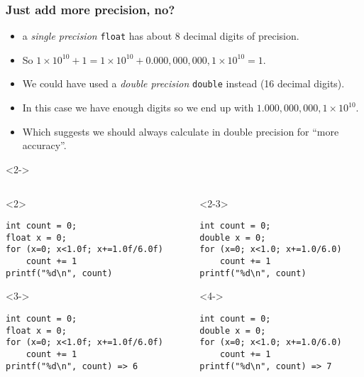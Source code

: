 \documentclass[presentation]{beamer}
\begin{document}
\begin{frame}[fragile]
  \frametitle{Just add more precision, no?}

  \begin{itemize}
  \item a \emph{single precision} \texttt{float} has about 8 decimal
    digits of precision.
  \item So $1\times10^{10} + 1 = 1\times10^{10} + 0.000,000,000,1\times10^{10} = 1$.
  \item We could have used a \emph{double precision} \texttt{double}
    instead (16 decimal digits).
  \item In this case we have enough digits so we end up with
    $1.000,000,000,1\times10^{10}$.
  \item Which suggests we should always calculate in double precision
    for ``more accuracy''.
  \end{itemize}

  \begin{uncoverenv}<2->
    \begin{columns}
      \begin{column}{0.5\textwidth}
        \begin{onlyenv}<2>
\begin{verbatim}
int count = 0;
float x = 0;
for (x=0; x<1.0f; x+=1.0f/6.0f)
    count += 1
printf("%d\n", count)
\end{verbatim}
        \end{onlyenv}
        \begin{onlyenv}<3->
\begin{verbatim}
int count = 0;
float x = 0;
for (x=0; x<1.0f; x+=1.0f/6.0f)
    count += 1
printf("%d\n", count) => 6
\end{verbatim}
        \end{onlyenv}
      \end{column}
      \begin{column}{0.5\textwidth}
        \begin{onlyenv}<2-3>
\begin{verbatim}
int count = 0;
double x = 0;
for (x=0; x<1.0; x+=1.0/6.0)
    count += 1
printf("%d\n", count)
\end{verbatim}
        \end{onlyenv}
        \begin{onlyenv}<4->
\begin{verbatim}
int count = 0;
double x = 0;
for (x=0; x<1.0; x+=1.0/6.0)
    count += 1
printf("%d\n", count) => 7
\end{verbatim}
        \end{onlyenv}
      \end{column}
    \end{columns}
  \end{uncoverenv}
\end{frame}
\end{document}

